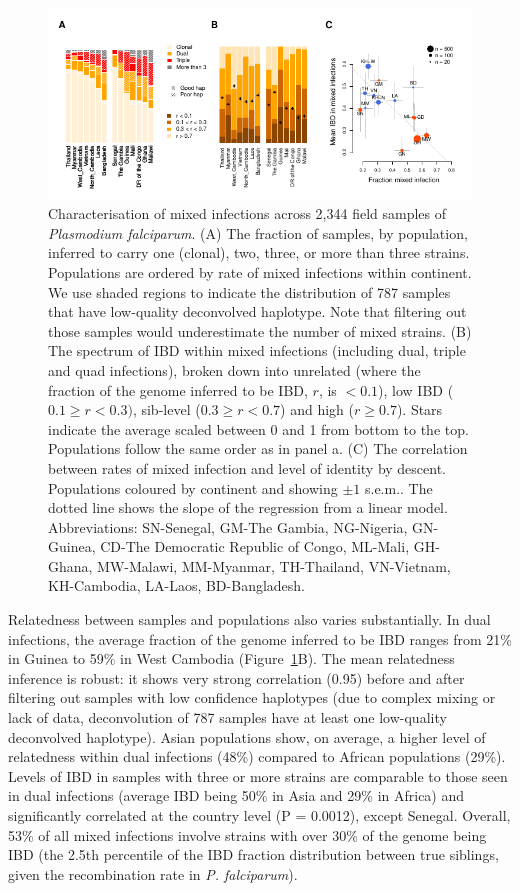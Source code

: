 \documentclass[9pt,lineno]{elife}
\begin{document}
\begin{figure}[ht]
  \begin{center}
    \includegraphics[width=\textwidth]{Fig3.pdf}
    \caption{Characterisation of mixed infections across 2,344 field samples of {\it Plasmodium falciparum}. (A) The fraction of samples, by population, inferred to carry one (clonal), two, three, or more than three strains.  Populations are ordered by rate of mixed infections within continent. We use shaded regions to indicate the distribution of 787 samples that have low-quality deconvolved haplotype. Note that filtering out those samples would underestimate the number of mixed strains. (B) The spectrum of IBD within mixed infections (including dual, triple and quad infections), broken down into unrelated (where the fraction of the genome inferred to be IBD, $r$, is $< 0.1$), low IBD ($0.1 \geq r < 0.3)$, sib-level ($0.3 \geq r<0.7$) and high ($r \geq 0.7$). Stars indicate the average scaled between 0 and 1 from bottom to the top.  Populations follow the same order as in panel a.  (C) The correlation between rates of mixed infection and level of identity by descent. Populations coloured by continent and showing $\pm 1$ s.e.m..  The dotted line shows the slope of the regression from a linear model.  Abbreviations: SN-Senegal, GM-The Gambia, NG-Nigeria, GN-Guinea, CD-The Democratic Republic of Congo, ML-Mali, GH-Ghana, MW-Malawi, MM-Myanmar, TH-Thailand, VN-Vietnam, KH-Cambodia, LA-Laos, BD-Bangladesh.} \label{fig:mixInfPlot}
  \end{center}
\end{figure}

Relatedness between samples and populations also varies substantially.  In dual infections, the average fraction of the genome inferred to be IBD ranges from 21\% in Guinea to 59\% in West Cambodia (Figure~\ref{fig:mixInfPlot}B). The mean relatedness inference is robust: it shows very strong correlation (0.95) before and after filtering out samples with low confidence  haplotypes (due to complex mixing or lack of data, deconvolution of 787 samples have at least one low-quality deconvolved haplotype).  Asian populations show, on average, a higher level of relatedness within dual infections (48\%) compared to African populations (29\%).  Levels of IBD in samples with three or more strains are comparable to those seen in dual infections (average IBD being 50\% in Asia and 29\% in Africa) and significantly correlated at the country level (P = 0.0012), except Senegal.  Overall, 53\% of all mixed infections involve strains with over 30\% of the genome being IBD (the 2.5th percentile of the IBD fraction distribution between true siblings, given the recombination rate in {\it P. falciparum}).
\end{document}
